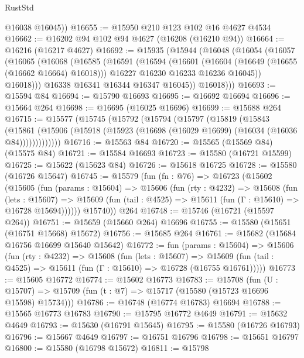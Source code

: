 \begin{lexlean}{RustStd}
\begin{coremodule}
        @16038
        @16045))
@16655 := @15950 @210 @123 @102 @16 @4627 @4534
@16662 := @16202 @94 @102 @94 @4627 (@16208 (@16210 @94))
@16664 := @16216 (@16217 @4627)
@16692 := @15935
    (@15944
      (@16048
        (@16054
          (@16057
            (@16065
              (@16068
                (@16585
                  (@16591
                    (@16594
                      (@16601
                        (@16604 (@16649 (@16655 (@16662 @16664) @16018)))
                        @16227
                        @16230
                        @16233
                        @16236
                        @16045))
                    @16018)))
              @16338
              @16341
              @16344
              @16347
              @16045))
          @16018)))
@16693 := @15594 @84
@16694 := @15790 @16693
@16695 := @16692 @16694
@16696 := @15664 @264
@16698 := @16695 (@16025 @16696)
@16699 := @15688 @264
@16715 := @15577
    (@15745
      (@15792
        (@15794
          (@15797
            (@15819
              (@15843
                (@15861
                  (@15906 (@15918 (@15923 (@16698 (@16029 @16699) (@16034 (@16036 @84)))))))))))))
@16716 := @15563 @84
@16720 := @15565 (@15569 @84) (@15575 @84)
@16721 := @15584 @16693
@16723 := @15580 (@16721 @15599)
@16725 := @15622 (@15623 @84)
@16726 := @15618 @16725
@16728 := @15580 (@16726 @15647)
@16745 := @15579
    (fun (fn : @76) =>
    @16723
      (@15602
        (@15605
          (fun (params : @15604) =>
          @15606
            (fun (rty : @4232) =>
            @15608
              (fun (lets : @15607) =>
              @15609 (fun (tail : @4525) => @15611 (fun (Γ : @15610) => @16728 @15694))))))
        @15740))
    @264
@16748 := @15746 (@16721 (@15597 @264))
@16751 := @15659 (@15660 @264) @16696
@16755 := @15580 (@15651 (@16751 @15668) @15672)
@16756 := @15685 @264
@16761 := @15682 (@15684 @16756 @16699 @15640 @15642)
@16772 := fun (params : @15604) =>
  @15606
    (fun (rty : @4232) =>
    @15608
      (fun (lets : @15607) =>
      @15609 (fun (tail : @4525) => @15611 (fun (Γ : @15610) => @16728 (@16755 @16761)))))
@16773 := @15605 @16772
@16774 := @15602 @16773
@16783 := @15708
    (fun (U : @15707) => @15709 (fun (t : @7) => @15717 (@15580 (@15723 @16696 @15598) @15734)))
@16786 := @16748 (@16774 @16783) @16694
@16788 := @15565 @16773 @16783
@16790 := @15795 @16772 @4649
@16791 := @15632 @4649
@16793 := @15630 (@16791 @15645)
@16795 := @15580 (@16726 @16793)
@16796 := @15667 @4649
@16797 := @16751 @16796
@16798 := @15651 @16797
@16800 := @15580 (@16798 @15672)
@16811 := @15798

\end{coremodule}
\end{lexlean}
